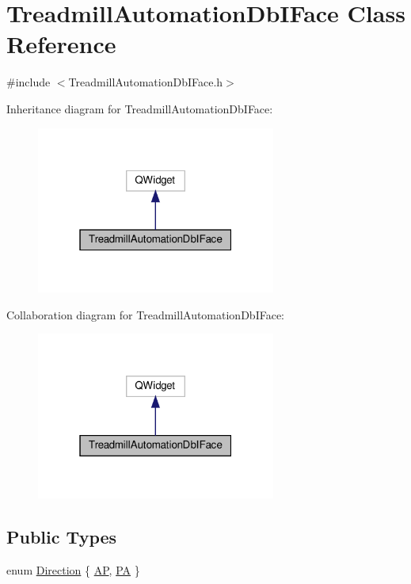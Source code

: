 \hypertarget{class_treadmill_automation_db_i_face}{}\section{Treadmill\+Automation\+Db\+I\+Face Class Reference}
\label{class_treadmill_automation_db_i_face}


{\ttfamily \#include $<$Treadmill\+Automation\+Db\+I\+Face.\+h$>$}



Inheritance diagram for Treadmill\+Automation\+Db\+I\+Face\+:
\nopagebreak
\begin{figure}[H]
\begin{center}
\leavevmode
\includegraphics[width=223pt]{class_treadmill_automation_db_i_face__inherit__graph}
\end{center}
\end{figure}


Collaboration diagram for Treadmill\+Automation\+Db\+I\+Face\+:
\nopagebreak
\begin{figure}[H]
\begin{center}
\leavevmode
\includegraphics[width=223pt]{class_treadmill_automation_db_i_face__coll__graph}
\end{center}
\end{figure}
\subsection*{Public Types}
\begin{DoxyCompactItemize}
\item 
enum \hyperlink{class_treadmill_automation_db_i_face_a65748311e422de400d4fedfadaf63b62}{Direction} \{ \hyperlink{class_treadmill_automation_db_i_face_a65748311e422de400d4fedfadaf63b62af95c7ff8ebc8ce83ee1fc6201c83a1c5}{AP}, 
\hyperlink{class_treadmill_automation_db_i_face_a65748311e422de400d4fedfadaf63b62a465cae5d713ba2af9d37a90fa6f19bbd}{PA}
 \}
\end{DoxyCompactItemize}
